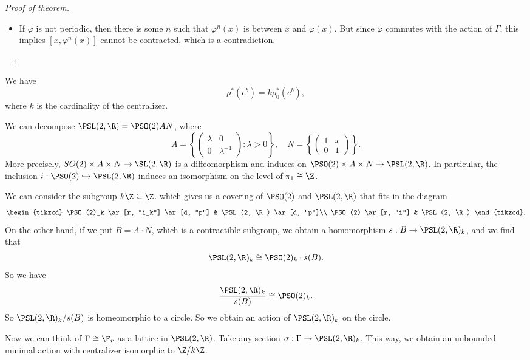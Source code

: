 \documentclass[a4paper]{article}
\begin{document}
\begin{proof}[Proof of theorem]
\begin{itemize}
    \item If $\varphi$ is not periodic, then there is some $n$ such that $\varphi^n(x)$ is between $x$ and $\varphi(x)$. But since $\varphi$ commutes with the action of $\Gamma$, this implies $[x, \varphi^n(x)]$ cannot be contracted, which is a contradiction.
  \end{itemize}
\end{proof}

\begin{ex}
  We have
  \[
    \rho^*(e^b) = k \rho^*_0(e^b),
  \]
  where $k$ is the cardinality of the centralizer.
\end{ex}

\begin{eg}
  We can decompose $\PSL(2, \R) = \PSO(2) AN$, where
  \[
    A = \left\{
      \begin{pmatrix}
        \lambda & 0\\
        0 & \lambda^{-1}
      \end{pmatrix}: \lambda >  0
    \right\},\quad N = \left\{
      \begin{pmatrix}
        1 & x\\
        0 & 1
      \end{pmatrix}
    \right\}.
  \]
  More precisely, $SO(2) \times A \times N \to \SL(2, \R)$ is a diffeomorphism and induces on $\PSO(2)\times A \times N \to \PSL(2, \R)$. In particular, the inclusion $i: \PSO(2) \hookrightarrow \PSL(2, \R)$ induces an isomorphism on the level of $\pi_1 \cong \Z$.

  We can consider the subgroup $k\Z \subseteq \Z$. which gives us a covering of $\PSO(2)$ and $\PSL(2, \R)$ that fits in the diagram
  \[
    \begin{tikzcd}
      \PSO(2)_k \ar[r, "i_k"] \ar[d, "p"] & \PSL(2, \R) \ar[d, "p"]\\
      \PSO(2) \ar[r, "i"] & \PSL(2, \R)
    \end{tikzcd}.
  \]
  On the other hand, if we put $B = A \cdot N$, which is a contractible subgroup, we obtain a homomorphism $s: B \to \PSL(2, \R)_k$, and we find that
  \[
    \PSL(2, \R)_k \cong \PSO(2)_k \cdot s(B).
  \]
  So we have
  \[
    \frac{\PSL(2, \R)_k}{ s(B)} \cong \PSO(2)_k.
  \]
  So $\PSL(2, \R)_k/s(B)$ is homeomorphic to a circle. So we obtain an action of $\PSL(2, \R)_k$ on the circle. %

  Now we can think of $\Gamma \cong \F_r$ as a lattice in $\PSL(2, \R)$. Take any section $\sigma: \Gamma \to \PSL(2, \R)_k$. This way, we obtain an unbounded minimal action with centralizer isomorphic to $\Z/k\Z$.
\end{eg}
\end{document}
